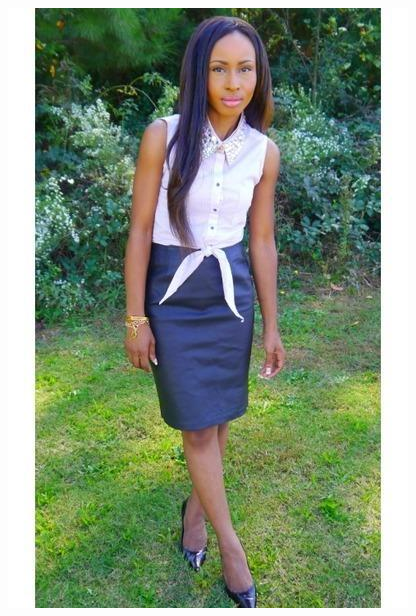 \documentclass[12pt]{report}
\begin{document}
\begin{figure}
\begin{minipage}[b]{0.3\textwidth}
    \includegraphics[width=\textwidth]{images/resultados/1082993original.jpg}
    \caption{}
  \end{minipage}
  \hfill
  \begin{minipage}[b]{0.3\textwidth}

\end{minipage}
\end{figure}
\end{document}
